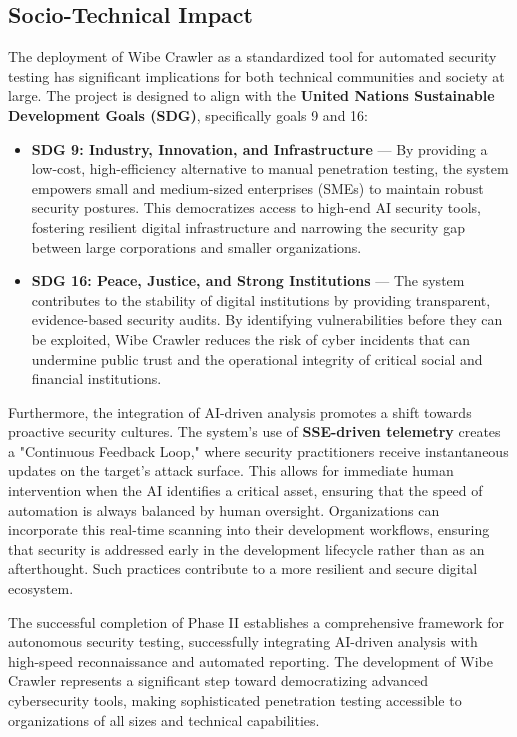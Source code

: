 \documentclass[12pt,oneside,a4paper]{book}
\begin{document}
\subsection{Socio-Technical Impact}

The deployment of Wibe Crawler as a standardized tool for automated security testing has significant implications for both technical communities and society at large. The project is designed to align with the \textbf{United Nations Sustainable Development Goals (SDG)}, specifically goals 9 and 16:

\begin{itemize}
  \item \textbf{SDG 9: Industry, Innovation, and Infrastructure} --- By providing a low-cost, high-efficiency alternative to manual penetration testing, the system empowers small and medium-sized enterprises (SMEs) to maintain robust security postures. This democratizes access to high-end AI security tools, fostering resilient digital infrastructure and narrowing the security gap between large corporations and smaller organizations.
  
  \item \textbf{SDG 16: Peace, Justice, and Strong Institutions} --- The system contributes to the stability of digital institutions by providing transparent, evidence-based security audits. By identifying vulnerabilities before they can be exploited, Wibe Crawler reduces the risk of cyber incidents that can undermine public trust and the operational integrity of critical social and financial institutions.
\end{itemize}

Furthermore, the integration of AI-driven analysis promotes a shift towards proactive security cultures. The system's use of \textbf{SSE-driven telemetry} creates a "Continuous Feedback Loop," where security practitioners receive instantaneous updates on the target's attack surface. This allows for immediate human intervention when the AI identifies a critical asset, ensuring that the speed of automation is always balanced by human oversight. Organizations can incorporate this real-time scanning into their development workflows, ensuring that security is addressed early in the development lifecycle rather than as an afterthought. Such practices contribute to a more resilient and secure digital ecosystem.

The successful completion of Phase II establishes a comprehensive framework for autonomous security testing, successfully integrating AI-driven analysis with high-speed reconnaissance and automated reporting. The development of Wibe Crawler represents a significant step toward democratizing advanced cybersecurity tools, making sophisticated penetration testing accessible to organizations of all sizes and technical capabilities.
\end{document}
